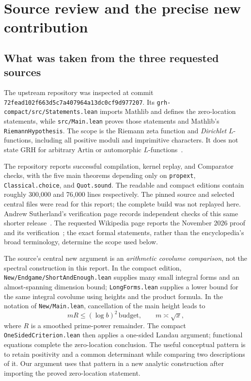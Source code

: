 \section{Source review and the precise new contribution}
\label{sec:sources}

\subsection{What was taken from the three requested sources}

The upstream repository was inspected at commit
\texttt{72fead102f663d5c7a407964a13dc0cf9d977207}.  Its
\texttt{grh-compact/src/Statements.lean} imports Mathlib and defines the
zero-location statements, while \texttt{src/Main.lean} proves those
statements and Mathlib's \texttt{RiemannHypothesis}.  The scope is the
Riemann zeta function and \emph{Dirichlet} $L$-functions, including all
positive moduli and imprimitive characters.  It does not state GRH for
arbitrary Artin or automorphic $L$-functions~\cite{upstream}.

The repository reports successful compilation, kernel replay, and
Comparator checks, with the five main theorems depending only on
\texttt{propext}, \texttt{Classical.choice}, and \texttt{Quot.sound}.
The readable and compact editions contain roughly 300,000 and 76,000
lines respectively.  The pinned source and selected central files were
read for this report; the complete build was not replayed here.
Andrew Sutherland's verification page records independent checks of this
same shorter release~\cite{sutherland}.  The requested Wikipedia page
reports the November 2026 proof and its verification~\cite{wikipedia};
the exact formal statements, rather than the encyclopedia's broad
terminology, determine the scope used below.

The source's central new argument is an \emph{arithmetic covolume
comparison}, not the spectral construction in this report.  In the
compact edition, \texttt{New/Endgame/ShortAndEnough.lean} supplies many
small integral forms and an almost-spanning dimension bound;
\texttt{LongForms.lean} supplies a lower bound for the same integral
covolume using heights and the product formula.  In the notation of
\texttt{New/Main.lean}, cancellation of the main height leads to
\[
 mR\le (\log b)^2\,\mathrm{budget},\qquad m\asymp\sqrt x,
\]
where $R$ is a smoothed prime-power remainder.  The compact
\texttt{OneSidedCriterion.lean} then applies a one-sided Landau argument;
functional equations complete the zero-location conclusion.
The useful conceptual pattern is to retain positivity and a common
determinant while comparing two descriptions of it.  Our argument
uses that pattern in a new analytic construction after importing the
proved zero-location statement.

